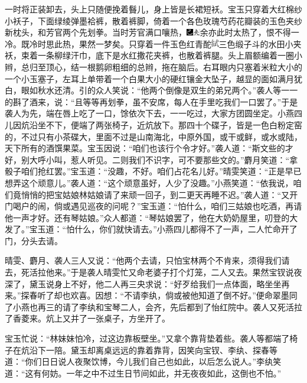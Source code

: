 一时将正装卸去，头上只随便挽着䰖儿，身上皆是长裙短袄。宝玉只穿着大红棉纱小袄子，下面绿绫弹墨袷裤，散着裤脚，倚着一个各色玫瑰芍药花瓣装的玉色夹纱新枕头，和芳官两个先划拳。当时芳官满口嚷热，{\includegraphics[width=3mm]{../Images/00003}\includegraphics[width=3mm]{../Images/00012}\footnotesize \kaishu 余亦此时太热了，恨不得一冷。既冷时思此热，果然一梦矣。}只穿着一件玉色红青酡\includegraphics[width=9.4pt,height=9.4pt,align=c,vshift=1pt]{../images/00029}三色缎子斗的水田小夹袄，束着一条柳绿汗巾，底下是水红撒花夹裤，也散着裤腿。头上眉额编着一圈小辫，总归至顶心，结一根鹅卵粗细的总辫，拖在脑后。右耳眼内只塞着米粒大小的一个小玉塞子，左耳上单带着一个白果大小的硬红镶金大坠子，越显的面如满月犹白，眼如秋水还清。引的众人笑说：“他两个倒像是双生的弟兄两个。”袭人等一一的斟了酒来，说：“且等等再划拳，虽不安席，每人在手里吃我们一口罢了。”于是袭人为先，端在唇上吃了一口，馀依次下去，一一吃过，大家方团圆坐定。小燕四儿因炕沿坐不下，便端了两张椅子，近炕放下。那四十个碟子，皆是一色白粉定窑的，不过只有小茶碟大，里面不过是山南海北，中原外国，或干或鲜，或水或陆，天下所有的酒馔果菜。宝玉因说：“咱们也该行个令才好。”袭人道：“斯文些的才好，别大呼小叫，惹人听见。二则我们不识字，可不要那些文的。”麝月笑道：“拿骰子咱们抢红罢。”宝玉道：“没趣，不好。咱们占花名儿好。”晴雯笑道：“正是早已想弄这个顽意儿。”袭人道：“这个顽意虽好，人少了没趣。”小燕笑道：“依我说，咱们竟悄悄的把宝姑娘林姑娘请了来顽一回子，到二更天再睡不迟。”袭人道：“又开门喝户的闹，倘或遇见巡夜的问呢？”宝玉道：“怕什么，咱们三姑娘也吃酒，再请他一声才好。还有琴姑娘。”众人都道：“琴姑娘罢了，他在大奶奶屋里，叨登的大发了。”宝玉道：“怕什么，你们就快请去。”小燕四儿都得不了一声，二人忙命开了门，分头去请。

晴雯、麝月、袭人三人又说：“他两个去请，只怕宝林两个不肯来，须得我们请去，死活拉他来。”于是袭人晴雯忙又命老婆子打个灯笼，二人又去。果然宝钗说夜深了，黛玉说身上不好，他二人再三央求说：“好歹给我们一点体面，略坐坐再来。”探春听了却也欢喜。因想：“不请李纨，倘或被他知道了倒不好。”便命翠墨同了小燕也再三的请了李纨和宝琴二人，会齐，先后都到了怡红院中。袭人又死活拉了香菱来。炕上又并了一张桌子，方坐开了。

宝玉忙说：“林妹妹怕冷，过这边靠板壁坐。”又拿个靠背垫着些。袭人等都端了椅子在炕沿下一陪。黛玉却离桌远远的靠着靠背，因笑向宝钗、李纨、探春等道：“你们日日说人夜聚饮博，今儿我们自己也如此，以后怎么说人。”李纨笑道：“这有何妨。一年之中不过生日节间如此，并无夜夜如此，这倒也不怕。”

